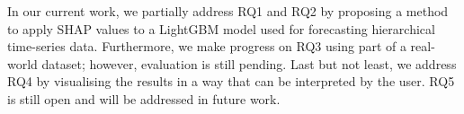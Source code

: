 In our current work, we partially address RQ1 and RQ2 by proposing a method to apply SHAP values to a LightGBM model
used for forecasting hierarchical time-series data.
Furthermore, we make progress on RQ3 using part of a real-world dataset; however, evaluation is still pending.
Last but not least, we address RQ4 by visualising the results in a way that can be interpreted by the user.
RQ5 is still open and will be addressed in future work.





%
%


